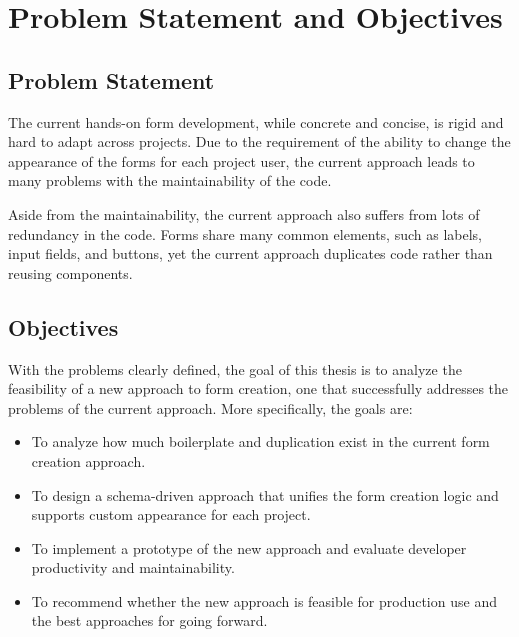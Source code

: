 \section{Problem Statement and Objectives}

\subsection{Problem Statement}
The current hands-on form development, while concrete and concise, is rigid and hard to adapt across projects.
Due to the requirement of the ability to change the appearance of the forms for each project user, the current approach
leads to many problems with the maintainability of the code.

Aside from the maintainability, the current approach also suffers from lots of redundancy in the code.
Forms share many common elements, such as labels, input fields, and buttons, yet the current approach duplicates code
rather than reusing components.

\subsection{Objectives}

With the problems clearly defined, the goal of this thesis is to analyze the feasibility of a new approach to form
creation, one that successfully addresses the problems of the current approach.
More specifically, the goals are:

\begin{itemize}
    \item To analyze how much boilerplate and duplication exist in the current form creation approach.
    \item To design a schema-driven approach that unifies the form creation logic and supports custom appearance for each
    project.
    \item To implement a prototype of the new approach and evaluate developer productivity and maintainability.
    \item To recommend whether the new approach is feasible for production use and the best approaches for going forward.
\end{itemize}